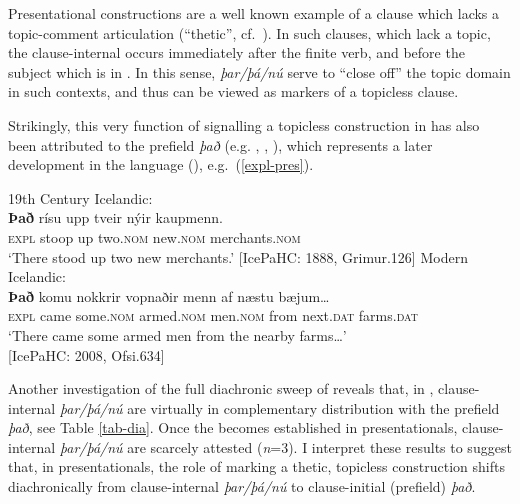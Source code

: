 \documentclass[output=paper,colorlinks,citecolor=brown]{langscibook}
\begin{document}
\noindent Presentational constructions are a well known example of a clause which lacks a topic-comment articulation (``thetic'', cf.~\citealp{sasse2013thetic}). In such clauses, which lack a topic, the clause-internal  occurs immediately after the finite verb, and before the subject which is in . In this sense, \textit{þar/þá/nú} serve to ``close off'' the topic domain in such contexts, and thus can be viewed as markers of a topicless clause.

Strikingly, this very function of signalling a topicless construction in  has also been attributed to the prefield  \textit{það} (e.g. \citealp[29]{Rognvaldsson1990}, \citealp{Sells2005}, \citealp[145]{Sigurdsson2007}), which represents a later development in the language (\citealp{Hroarsdottir1998,Rognvaldsson2002,booth2018,booth2019cataphora,booth2020expletives}), e.g.~(\ref{expl-pres}).

\ea \label{expl-pres}
\ea 19th Century Icelandic:\\
\gll \textbf{Það} rísu upp tveir nýir kaupmenn.\\
\textsc{expl} stoop up two.\textsc{nom} new.\textsc{nom} merchants.\textsc{nom}\\
\glt `There stood up two new merchants.' \hfill [IcePaHC: 1888, Grimur.126]
\ex Modern Icelandic: \\
\gll \textbf{Það} komu nokkrir vopnaðir menn af næstu bæjum\dots\\
\textsc{expl} came some.\textsc{nom} armed.\textsc{nom} men.\textsc{nom} from next.\textsc{dat} farms.\textsc{dat}\\
\glt `There came some armed men from the nearby farms\dots' \\ \hfill [IcePaHC: 2008, Ofsi.634]
\z 
\z 

\noindent Another investigation of the full diachronic sweep of  reveals that, in , clause-internal  \textit{þar/þá/nú} are virtually in complementary distribution with the prefield  \textit{það}, see Table \ref{tab-dia}. Once the  becomes established in presentationals, clause-internal \textit{þar/þá/nú} are scarcely attested (\textit{n}=3). I interpret these results to suggest that, in presentationals, the role of marking a thetic, topicless construction shifts diachronically from clause-internal \textit{þar/þá/nú} to clause-initial (prefield) \textit{það}.
\end{document}
